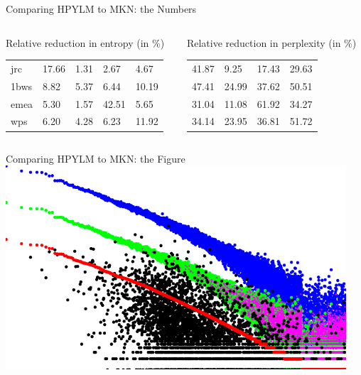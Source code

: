 \begin{frame}{Comparing HPYLM to MKN: the Numbers}
        \begin{columns}[b]
            \begin{column}[b]{0.45\textwidth}
                \begin{block}{Relative reduction in entropy (in \%)}
                \begin{tabular}{lllll}
                    jrc  & 17.66 & 1.31 & 2.67  & 4.67  \\
                    1bws & 8.82  & 5.37 & 6.44  & 10.19 \\
                    emea & 5.30  & 1.57 & 42.51 & 5.65  \\
                    wps  & 6.20  & 4.28 & 6.23  & 11.92 \\
                \end{tabular}
                \end{block}
                \vspace{0pt}
            \end{column}
            \quad
            \begin{column}[b]{0.45\textwidth}
                \begin{block}{Relative reduction in perplexity (in \%)}
                \begin{tabular}{llll}
                    41.87 & 9.25  & 17.43 & 29.63 \\
                    47.41 & 24.99 & 37.62 & 50.51 \\
                    31.04 & 11.08 & 61.92 & 34.27 \\
                    34.14 & 23.95 & 36.81 & 51.72 \\ 
                \end{tabular}
                \end{block}
                \vspace{0pt}
            \end{column}            
        \end{columns}

\end{frame}

\begin{frame}{Comparing HPYLM to MKN: the Figure}
    \includegraphics[width=0.95\textwidth]{ngramdata.pdf}
\end{frame}

